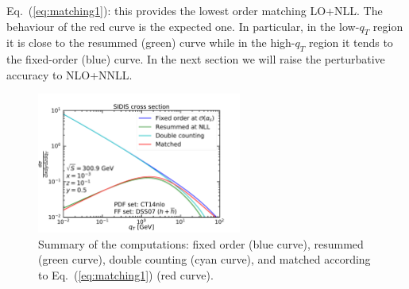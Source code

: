\documentclass[10pt,a4paper]{article}
\begin{document}
Eq.~(\ref{eq:matching1}): this provides the lowest order matching
LO+NLL. The behaviour of the red curve is the expected one. In
particular, in the low-$q_T$ region it is close to the resummed
(green) curve while in the high-$q_T$ region it tends to the
fixed-order (blue) curve. In the next section we will raise the
perturbative accuracy to NLO+NNLL.
\begin{figure}[t]
  \begin{centering}
    \includegraphics[width=0.6\textwidth]{plots/FONLL}
    \caption{Summary of the computations: fixed order (blue curve),
      resummed (green curve), double counting (cyan curve), and
      matched according to Eq.~(\ref{eq:matching1}) (red
      curve).\label{fig:FONLL}}
  \end{centering}
\end{figure}


\appendix
\end{document}
